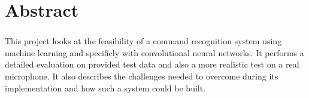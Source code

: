\chapter*{Abstract} 
\subsection*{\thesistitle}

This project looks at the feasibility of a command recognition system using machine learning and specificly with convolutional neural networks. It 
performs a detailed evaluation on provided test data and also a more realistic test on a real microphone. It also describes the challenges needed
to overcome during its implementation and how such a system could be built.
